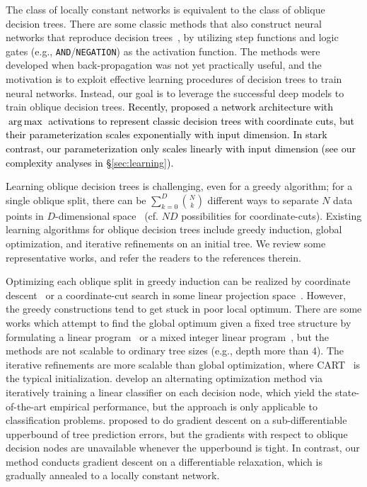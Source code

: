 \documentclass{article} \usepackage{iclr2020_conference,times}
\newcommand{\camera}[1]{\textcolor{black}{#1}}
\DeclareMathOperator*{\argmax}{arg\,max}
\newcommand{\xref}[1]{\S\ref{#1}}
\begin{document}
The {class} of locally constant networks is equivalent to the class of oblique decision trees. 
There are some classic methods that also construct neural networks that reproduce decision trees~\citep{sethi1990entropy, brent1991fast, cios1992machine}, by utilizing step functions and logic gates (e.g., \texttt{AND}/\texttt{NEGATION}) as the activation function. The methods were developed when back-propagation was not yet practically useful, and the motivation is to exploit effective learning procedures of decision trees to train neural networks. Instead, our goal is to leverage the successful deep models to train oblique decision trees. 
\camera{Recently, \cite{yang2018deep} proposed a network architecture with $\argmax$ activations to represent classic decision trees with coordinate cuts, but their parameterization scales exponentially with input dimension. In stark contrast, our parameterization only scales linearly with input dimension (see our complexity analyses in \xref{sec:learning}).}

Learning oblique decision trees is challenging, even for a greedy algorithm; for a single oblique split, there can be $\sum_{k=0}^D \binom{N}{k}$ different ways to separate $N$ data points in $D$-dimensional space~\citep{vapnik1971growth} (cf. $N D$ possibilities for coordinate-cuts). Existing learning algorithms for oblique decision trees include greedy induction, global optimization, and iterative refinements on an initial tree. We review some representative works, and refer the readers to the references therein.

Optimizing each oblique split in greedy induction can be realized by coordinate descent~\citep{murthy1994system} or a coordinate-cut search in some linear projection space~\citep{menze2011oblique, wickramarachchi2016hhcart}. However, the greedy constructions tend to get stuck in poor local optimum. There are some works which attempt to find the global optimum given a fixed tree structure by formulating a linear program~\citep{bennett1994global} or a mixed integer linear program~\citep{bertsimas2017optimal}, but the methods are not scalable to ordinary tree sizes (e.g., depth more than 4). The iterative refinements are more scalable than global optimization, where CART~\citep{cart84} is the typical initialization. \citet{carreira2018alternating} develop an alternating optimization method via iteratively training a linear classifier on each decision node, which yield the state-of-the-art empirical performance, but the approach is only applicable to classification problems. 
\citet{norouzi2015efficient} proposed to do gradient descent on a sub-differentiable upperbound of tree prediction errors, but the gradients with respect to oblique decision nodes are unavailable whenever the upperbound is tight. In contrast, our method conducts gradient descent on a differentiable relaxation, which is gradually annealed to a locally constant network.
\end{document}
